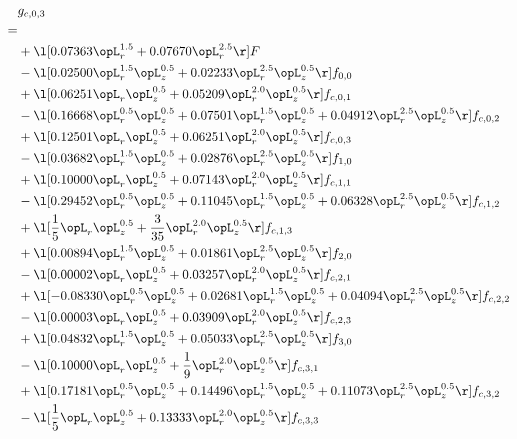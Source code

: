 \begin{alignat}{2} 
\label{eq:g_03_0} 
& g_{c,0,3} \nonumber \\ 
 = \\ 
& + \l[  0.07363 \opL_r^{1.5} +  0.07670 \opL_r^{2.5}  \r] F \nonumber \\ 
& - \l[  0.02500 \opL_r^{1.5} \opL_z^{0.5} +  0.02233 \opL_r^{2.5} \opL_z^{0.5}  \r] f_{0,0} \nonumber \\ 
& + \l[  0.06251 \opL_r \opL_z^{0.5} +  0.05209 \opL_r^{2.0} \opL_z^{0.5}  \r] f_{c,0,1} \nonumber \\ 
& - \l[  0.16668 \opL_r^{0.5} \opL_z^{0.5} +  0.07501 \opL_r^{1.5} \opL_z^{0.5} +  0.04912 \opL_r^{2.5} \opL_z^{0.5}  \r] f_{c,0,2} \nonumber \\ 
& + \l[  0.12501 \opL_r \opL_z^{0.5} +  0.06251 \opL_r^{2.0} \opL_z^{0.5}  \r] f_{c,0,3} \nonumber \\ 
& - \l[  0.03682 \opL_r^{1.5} \opL_z^{0.5} +  0.02876 \opL_r^{2.5} \opL_z^{0.5}  \r] f_{1,0} \nonumber \\ 
& + \l[  0.10000 \opL_r \opL_z^{0.5} +  0.07143 \opL_r^{2.0} \opL_z^{0.5}  \r] f_{c,1,1} \nonumber \\ 
& - \l[  0.29452 \opL_r^{0.5} \opL_z^{0.5} +  0.11045 \opL_r^{1.5} \opL_z^{0.5} +  0.06328 \opL_r^{2.5} \opL_z^{0.5}  \r] f_{c,1,2} \nonumber \\ 
& + \l[ \frac{1}{5} \opL_r \opL_z^{0.5} + \frac{3}{35} \opL_r^{2.0} \opL_z^{0.5}  \r] f_{c,1,3} \nonumber \\ 
& + \l[  0.00894 \opL_r^{1.5} \opL_z^{0.5} +  0.01861 \opL_r^{2.5} \opL_z^{0.5}  \r] f_{2,0} \nonumber \\ 
& - \l[  0.00002 \opL_r \opL_z^{0.5} +  0.03257 \opL_r^{2.0} \opL_z^{0.5}  \r] f_{c,2,1} \nonumber \\ 
& + \l[  -0.08330 \opL_r^{0.5} \opL_z^{0.5} +  0.02681 \opL_r^{1.5} \opL_z^{0.5} +  0.04094 \opL_r^{2.5} \opL_z^{0.5}  \r] f_{c,2,2} \nonumber \\ 
& - \l[  0.00003 \opL_r \opL_z^{0.5} +  0.03909 \opL_r^{2.0} \opL_z^{0.5}  \r] f_{c,2,3} \nonumber \\ 
& + \l[  0.04832 \opL_r^{1.5} \opL_z^{0.5} +  0.05033 \opL_r^{2.5} \opL_z^{0.5}  \r] f_{3,0} \nonumber \\ 
& - \l[  0.10000 \opL_r \opL_z^{0.5} + \frac{1}{9} \opL_r^{2.0} \opL_z^{0.5}  \r] f_{c,3,1} \nonumber \\ 
& + \l[  0.17181 \opL_r^{0.5} \opL_z^{0.5} +  0.14496 \opL_r^{1.5} \opL_z^{0.5} +  0.11073 \opL_r^{2.5} \opL_z^{0.5}  \r] f_{c,3,2} \nonumber \\ 
& - \l[ \frac{1}{5} \opL_r \opL_z^{0.5} +  0.13333 \opL_r^{2.0} \opL_z^{0.5}  \r] f_{c,3,3} \nonumber \\ 
\end{alignat} 


